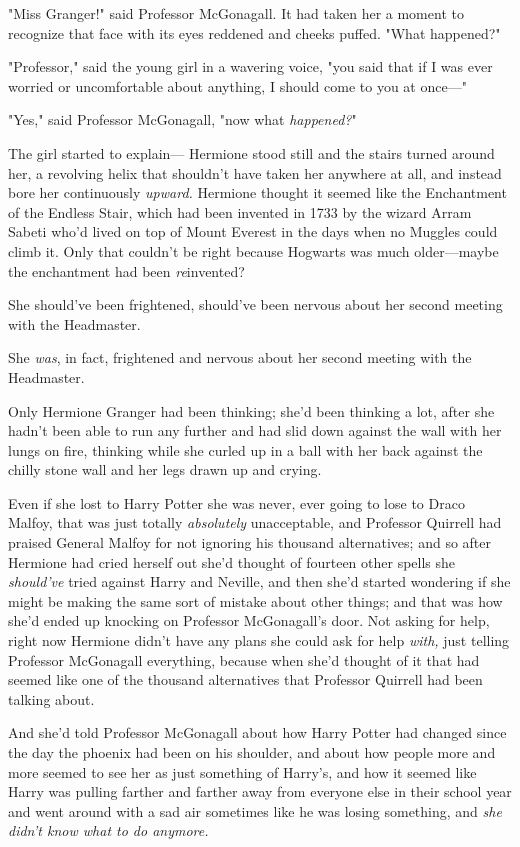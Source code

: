"Miss Granger!" said Professor McGonagall. It had taken her a moment to 
recognize that face with its eyes reddened and cheeks puffed. "What happened?"

"Professor," said the young girl in a wavering voice, "you said that if I was 
ever worried or uncomfortable about anything, I should come to you at once---"

"Yes," said Professor McGonagall, "now what \emph{happened?}"

The girl started to explain---
\sbreak
Hermione stood still and the stairs turned around her, a revolving helix that 
shouldn't have taken her anywhere at all, and instead bore her continuously 
\emph{upward.} Hermione thought it seemed like the Enchantment of the Endless 
Stair, which had been invented in 1733 by the wizard Arram Sabeti who'd lived 
on top of Mount Everest in the days when no Muggles could climb it. Only that 
couldn't be right because Hogwarts was much older---maybe the enchantment had 
been \emph{re}invented?

She should've been frightened, should've been nervous about her second meeting 
with the Headmaster.

She \emph{was}, in fact, frightened and nervous about her second meeting with 
the Headmaster.

Only Hermione Granger had been thinking; she'd been thinking a lot, after she 
hadn't been able to run any further and had slid down against the wall with her 
lungs on fire, thinking while she curled up in a ball with her back against the 
chilly stone wall and her legs drawn up and crying.

Even if she lost to Harry Potter she was never, ever going to lose to Draco 
Malfoy, that was just totally \emph{absolutely} unacceptable, and Professor 
Quirrell had praised General Malfoy for not ignoring his thousand alternatives; 
and so after Hermione had cried herself out she'd thought of fourteen other 
spells she \emph{should've} tried against Harry and Neville, and then she'd 
started wondering if she might be making the same sort of mistake about other 
things; and that was how she'd ended up knocking on Professor McGonagall's 
door. Not asking for help, right now Hermione didn't have any plans she could 
ask for help \emph{with,} just telling Professor McGonagall everything, because 
when she'd thought of it that had seemed like one of the thousand alternatives 
that Professor Quirrell had been talking about.

And she'd told Professor McGonagall about how Harry Potter had changed since 
the day the phoenix had been on his shoulder, and about how people more and 
more seemed to see her as just something of Harry's, and how it seemed like 
Harry was pulling farther and farther away from everyone else in their school 
year and went around with a sad air sometimes like he was losing something, and 
\emph{she didn't know what to do anymore.}

